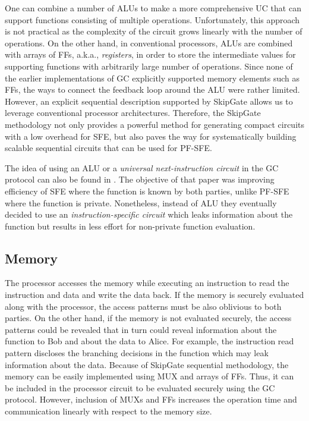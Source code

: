 One can combine a number of ALUs to make a more comprehensive UC that can support functions consisting of multiple operations.
Unfortunately, this approach is not practical as the complexity of the circuit grows linearly with the number of operations.
On the other hand, in conventional processors, ALUs are combined with arrays of FFs, a.k.a., \emph{registers}, in order to store the intermediate values for supporting functions with arbitrarily large number of operations.
Since none of the earlier implementations of GC explicitly supported memory elements such as FFs, the ways to connect the feedback loop around the ALU were rather limited.
However, an explicit sequential description supported by SkipGate allows us to leverage conventional processor architectures.
Therefore, the SkipGate methodology not only provides a powerful method for generating compact circuits with a low overhead for SFE, but also paves the way for systematically building scalable sequential circuits that can be used for PF-SFE.

The idea of using an ALU or a \emph{universal next-instruction circuit} in the GC protocol can also be found in \cite{liu2014automating}.
The objective of that paper was improving efficiency of SFE where the function is known by both parties, unlike PF-SFE where the function is private.
Nonetheless, instead of ALU they eventually decided to use an \emph{instruction-specific circuit} which leaks information about the function but results in less effort for non-private function evaluation.

\subsection{Memory}
The processor accesses the memory while executing an instruction to read the instruction and data and write the data back.
If the memory is securely evaluated along with the processor, the access patterns must be also oblivious to both parties.
On the other hand, if the memory is not evaluated securely, the access patterns could be revealed that in turn could reveal information about the function to Bob and about the data to Alice.
For example, the instruction read pattern discloses the branching decisions in the function which may leak information about the data.
Because of SkipGate sequential methodology, the memory can be easily implemented using MUX and arrays of FFs.
Thus, it can be included in the processor circuit to be evaluated securely using the GC protocol.
However, inclusion of MUXs and FFs increases the operation time and communication linearly with respect to the memory size.

